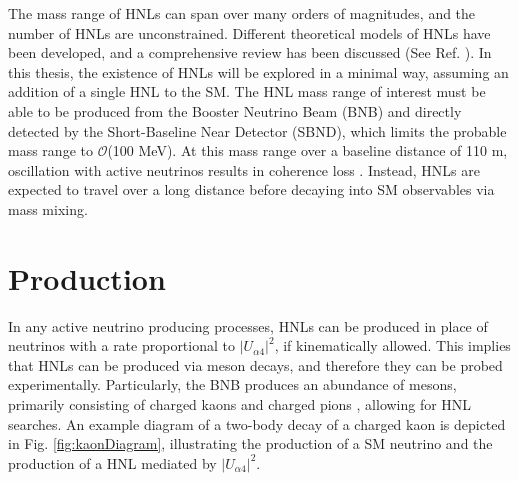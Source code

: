 The mass range of HNLs can span over many orders of magnitudes, and the number of HNLs are unconstrained.
Different theoretical models of HNLs have been developed, and a comprehensive review has been discussed (See Ref. \cite{HNLWhitePaper}). 
In this thesis, the existence of HNLs will be explored in a minimal way, assuming an addition of a single HNL to the SM.  
The HNL mass range of interest must be able to be produced from the Booster Neutrino Beam (BNB) and directly detected by the Short-Baseline Near Detector (SBND), which limits the probable mass range to $\mathcal{O}$(100 MeV).
At this mass range over a baseline distance of 110 m, oscillation with active neutrinos results in coherence loss \cite{SBNHNL}.
Instead, HNLs are expected to travel over a long distance before decaying into SM observables via mass mixing.

 
\section{Production}
\label{sec2Production}
In any active neutrino producing processes, HNLs can be produced in place of neutrinos with a rate proportional to $|U_{\alpha4}|^{2}$, if kinematically allowed. 
This implies that HNLs can be produced via meson decays, and therefore they can be probed experimentally.
Particularly, the BNB produces an abundance of mesons, primarily consisting of charged kaons and charged pions \cite{BNBFlux}, allowing for HNL searches.
An example diagram of a two-body decay of a charged kaon is depicted in Fig. \ref{fig:kaonDiagram}, illustrating the production of a SM neutrino and the production of a HNL mediated by $|U_{\alpha4}|^{2}$.

